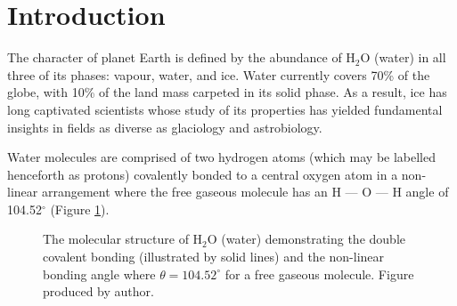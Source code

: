\section{Introduction}

The character of planet Earth is defined by the abundance of H$_2$O (water) in all three of its phases: 
vapour, water, and ice.
Water currently covers 70\% of the globe, with 10\% of the land mass carpeted in its solid phase.
As a result, ice has long captivated scientists whose study of its properties has yielded fundamental 
insights in fields as diverse as glaciology and astrobiology.

\par
Water molecules are comprised of two hydrogen atoms (which may be labelled henceforth as protons) 
covalently bonded to a central oxygen atom in a non-linear arrangement where the free gaseous molecule 
has an H --- O --- H angle of 104.52$^\circ$ (Figure \ref{fig:water}).

\begin{figure}[ht]
    \centering
    \vspace*{0.3cm}
    \vspace*{0.3cm}
    \caption{The molecular structure of H$_2$O (water) demonstrating the double covalent bonding (illustrated
    by solid lines) and the non-linear bonding angle where $\theta = 104.52^\circ$ for a free gaseous molecule.
    Figure produced by author.}
    \label{fig:water}
\end{figure}

